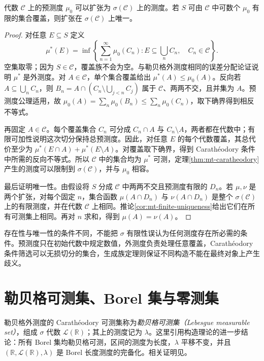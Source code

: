 \begin{theorem}[预测度扩张]
代数 $\mathcal C$ 上的预测度 $\mu_0$ 可以扩张为 $\sigma(\mathcal C)$ 上的测度。若 $S$ 可由 $\mathcal C$ 中可数个 $\mu_0$ 有限的集合覆盖，则扩张在 $\sigma(\mathcal C)$ 上唯一。
\label{thm:mt-extension}
\end{theorem}
\begin{proof}
对任意 $E\subseteq S$ 定义
\[
 \mu^*(E)=\inf\left\{\sum_{n=1}^{\infty}\mu_0(C_n):
 E\subseteq\bigcup_nC_n,\quad C_n\in\mathcal C\right\}.
\]
空集取零；因为 $S\in\mathcal C$，覆盖族不会为空。与勒贝格外测度相同的误差分配论证说明 $\mu^*$ 是外测度。对 $A\in\mathcal C$，单个集合覆盖给出 $\mu^*(A)\leq\mu_0(A)$。反向若 $A\subseteq\bigcup_nC_n$，则
$B_n=A\cap(C_n\setminus\bigcup_{j<n}C_j)$
属于 $\mathcal C$、两两不交，且并集为 $A$。预测度公理适用，故
$\mu_0(A)=\sum_n\mu_0(B_n)\leq\sum_n\mu_0(C_n)$，取下确界得到相反不等式。

再固定 $A\in\mathcal C$。每个覆盖集合 $C_n$ 可分成 $C_n\cap A$ 与 $C_n\setminus A$，两者都在代数中；有限可加性说明这次切分保持总预测度。因此，对任意 $E$ 的每个代数覆盖，其总代价至少为 $\mu^*(E\cap A)+\mu^*(E\setminus A)$。对覆盖取下确界，得到 Carathéodory 条件中所需的反向不等式。所以 $\mathcal C$ 中的集合均为 $\mu^*$ 可测，定理\ref{thm:mt-caratheodory}产生的测度可以限制到 $\sigma(\mathcal C)$，并与 $\mu_0$ 相容。

最后证明唯一性。由假设将 $S$ 分成 $\mathcal C$ 中两两不交且预测度有限的 $D_n$。若 $\mu,\nu$ 是两个扩张，对每个固定 $n$，集合函数 $\mu(A\cap D_n)$ 与 $\nu(A\cap D_n)$ 是整个 $\sigma(\mathcal C)$ 上的有限测度，并在代数 $\mathcal C$ 上相同。推论\ref{cor:mt-finite-uniqueness}给出它们在所有可测集上相同。再对 $n$ 求和，得到 $\mu(A)=\nu(A)$。
\end{proof}
存在性与唯一性的条件不同，不能把 $\sigma$ 有限性误认为任何测度存在所必需的条件。预测度只在初始代数中规定数值，外测度负责处理任意覆盖，Carathéodory 条件筛选可以无损切分的集合，生成族定理则保证不同构造不能在最终对象上产生歧义。

\section{勒贝格可测集、Borel 集与零测集}
勒贝格外测度的 Carathéodory 可测集称为\emph{勒贝格可测集（Lebesgue measurable set）}，组成 $\sigma$ 代数 $\mathcal L(\mathbb R)$；其上的测度记为 $\lambda$。这里引用构造理论的进一步结论：所有 Borel 集均勒贝格可测，区间的测度为长度，$\lambda$ 平移不变，并且 $(\mathbb R,\mathcal L(\mathbb R),\lambda)$ 是 Borel 长度测度的完备化。相关证明见\cite[第1章]{teschl-ra}。

